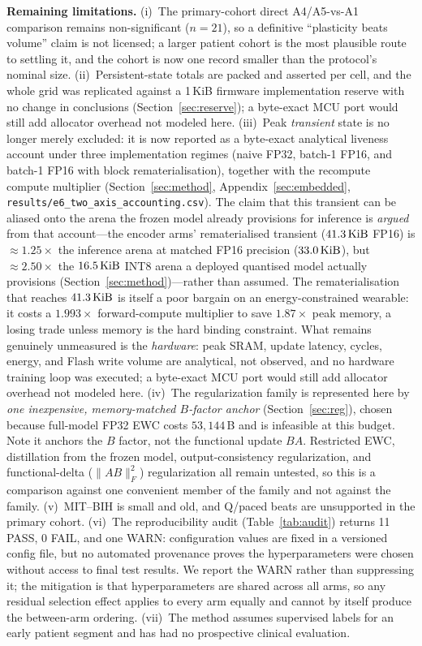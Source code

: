 \textbf{Remaining limitations.} (i)~The primary-cohort direct A4/A5-vs-A1
comparison remains non-significant ($n=21$), so a definitive ``plasticity beats
volume'' claim is not licensed; a larger patient cohort is the most plausible
route to settling it, and the cohort is now one record smaller than the
protocol's nominal size. (ii)~Persistent-state totals are packed and asserted per cell, and the whole grid
was replicated against a 1\,KiB firmware implementation reserve with no change in
conclusions (Section~\ref{sec:reserve}); a byte-exact MCU port would still add
allocator overhead not modeled here. (iii)~Peak \emph{transient} state is no
longer merely excluded: it is now reported as a byte-exact analytical liveness
account under three implementation regimes (naive FP32, batch-1 FP16, and
batch-1 FP16 with block rematerialisation), together with the recompute compute
multiplier (Section~\ref{sec:method}, Appendix~\ref{sec:embedded},
\texttt{results/e6\_two\_axis\_accounting.csv}). The claim that this transient
can be aliased onto the arena the frozen model already provisions for inference
is \emph{argued} from that account---the encoder arms' rematerialised transient
($41.3\,\mathrm{KiB}$ FP16) is $\approx1.25\times$ the inference arena at matched FP16
precision ($33.0\,\mathrm{KiB}$), but $\approx2.50\times$ the $16.5\,\mathrm{KiB}$ INT8 arena a
deployed quantised model actually provisions (Section~\ref{sec:method})---rather
than assumed. The rematerialisation that reaches $41.3\,\mathrm{KiB}$ is itself a poor
bargain on an energy-constrained wearable: it costs a $1.993\times$ forward-compute
multiplier to save $1.87\times$ peak memory, a losing trade unless memory is the
hard binding constraint. What remains genuinely unmeasured is the
\emph{hardware}: peak SRAM, update latency, cycles, energy, and Flash write
volume are analytical, not observed, and no hardware training loop was executed;
a byte-exact MCU port would still add allocator overhead not modeled here. (iv)~The regularization family is represented
here by \emph{one inexpensive, memory-matched $B$-factor anchor}
(Section~\ref{sec:reg}), chosen because full-model FP32 EWC costs
$53{,}144$\,B and is infeasible at this budget. Note it anchors the $B$ factor,
not the functional update $BA$. Restricted EWC, distillation from the frozen
model, output-consistency regularization, and functional-delta ($\|AB\|_F^2$)
regularization all remain untested, so this is a comparison against one
convenient member of the family and not against the family. (v)~MIT--BIH is small and old, and Q/paced beats are unsupported in the
primary cohort. (vi)~The reproducibility audit (Table~\ref{tab:audit}) returns 11 PASS, 0 FAIL,
and one WARN: configuration values are fixed in a versioned config file, but no automated
provenance proves the hyperparameters were chosen without access to final test
results. We report the WARN rather than suppressing it; the mitigation is that
hyperparameters are shared across all arms, so any residual selection effect
applies to every arm equally and cannot by itself produce the between-arm
ordering. (vii)~The method assumes supervised labels for an early patient segment
and has had no prospective clinical evaluation.

